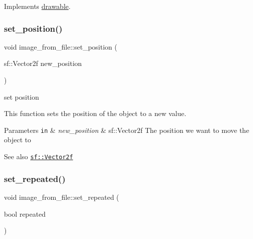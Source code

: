 Implements \hyperlink{classdrawable_ae013ac0be47538be9ce885d6642daf73}{drawable}.

\mbox{\label{classimage__from__file_a868911f8d541af91290fb8dc56435cd2}} 
\subsubsection{\texorpdfstring{set\+\_\+position()}{set\_position()}}
{\footnotesize\ttfamily void image\+\_\+from\+\_\+file\+::set\+\_\+position (\begin{DoxyParamCaption}\item[{sf\+::\+Vector2f}]{new\+\_\+position }\end{DoxyParamCaption})}



set position 

This function sets the position of the object to a new value.


\begin{DoxyParams}[1]{Parameters}
\mbox{\tt in}  & {\em new\+\_\+position} & sf\+::\+Vector2f The position we want to move the object to \\
\hline
\end{DoxyParams}
\begin{DoxySeeAlso}{See also}
\href{https://www.sfml-dev.org/documentation/2.0/classsf_1_1Vector2.php }{\tt sf\+::\+Vector2f} 
\end{DoxySeeAlso}
\mbox{\label{classimage__from__file_abaf0ebde2771171fdf91b55f4f6c5aa6}} 
\subsubsection{\texorpdfstring{set\+\_\+repeated()}{set\_repeated()}}
{\footnotesize\ttfamily void image\+\_\+from\+\_\+file\+::set\+\_\+repeated (\begin{DoxyParamCaption}\item[{bool}]{repeated }\end{DoxyParamCaption})}



